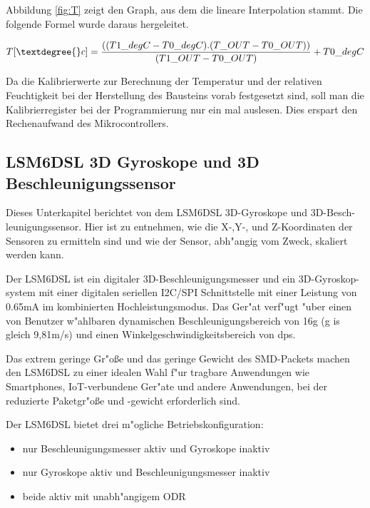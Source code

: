 Abbildung \ref{fig:T} zeigt den Graph, aus dem die lineare Interpolation 
stammt. Die folgende Formel wurde daraus hergeleitet.

\begin{center}
	\[
	T[\textdegree{}c] = \frac{((T1\_degC - T0\_degC) . (T\_OUT - 
	T0\_OUT))}{(T1\_OUT - T0\_OUT) } + T0\_degC  
	\]\label{TempFormel}
\end{center}

Da die Kalibrierwerte zur Berechnung der Temperatur und der relativen 
Feuchtigkeit bei der Herstellung des Bausteins vorab festgesetzt sind, 
soll man die Kalibrierregister bei der Programmierung nur ein mal 
auslesen. Dies erspart den Rechenaufwand des Mikrocontrollers.
 
\subsection{LSM6DSL 3D Gyroskope und 3D Beschleunigungssensor}\label{Acc/Gy}

Dieses Unterkapitel berichtet von dem LSM6DSL 3D-Gyroskope und 
3D-Besch-leunigungssensor. Hier ist zu entnehmen, wie die X-,Y-, und 
Z-Koordinaten der Sensoren zu ermitteln sind und wie der Sensor, 
abh"angig vom Zweck, skaliert werden kann.
 

Der LSM6DSL ist ein digitaler 3D-Beschleunigungsmesser und ein 
3D-Gyroskop-system mit einer digitalen seriellen I2C/SPI Schnittstelle 
mit einer Leistung von 0.65mA im kombinierten Hochleistungsmodus.
Das Ger"at verf"ugt "uber einen von Benutzer w"ahlbaren dynamischen 
Beschleunigungsbereich von  \textbar {} \textbar 
{} \textbar \textpm 16g (g is gleich 9,81m/s) und einen 
Winkelgeschwindigkeitsbereich von  \textbar {} 
\textbar {} \textbar {} \textbar {}\ac{dps}.
 
Das extrem geringe Gr"o\ss{}e und das geringe Gewicht des \ac{SMD}-Packets 
machen den LSM6DSL zu einer idealen Wahl f"ur tragbare Anwendungen wie 
Smartphones, IoT-verbundene Ger"ate und andere Anwendungen, bei der 
reduzierte Paketgr"o\ss{}e und -gewicht erforderlich sind.  

Der LSM6DSL bietet drei m"ogliche Betriebskonfiguration:
\begin{itemize}
	\item nur Beschleunigungsmesser aktiv und Gyroskope inaktiv
	\item nur Gyroskope aktiv und Beschleunigungsmesser inaktiv
	\item beide aktiv mit unabh"angigem \ac{ODR} 
\end{itemize}

